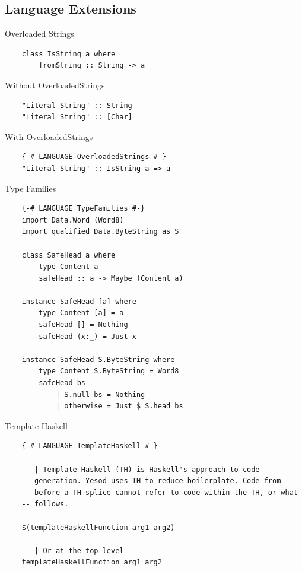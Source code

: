 \documentclass[pdf]{beamer}
\begin{document}
\subsection{Language Extensions}
\begin{frame}[fragile]{Overloaded Strings}
  \begin{verbatim}
    class IsString a where
        fromString :: String -> a
  \end{verbatim}
  \pause
  \vspace{1em}
  Without OverloadedStrings
  \begin{verbatim}
    "Literal String" :: String
    "Literal String" :: [Char]
  \end{verbatim}
  \pause
  \vspace{1em}
  With OverloadedStrings
  \begin{verbatim}
    {-# LANGUAGE OverloadedStrings #-}
    "Literal String" :: IsString a => a
  \end{verbatim}
\end{frame}

\begin{frame}[fragile]{Type Families}
  \begin{verbatim}
    {-# LANGUAGE TypeFamilies #-}
    import Data.Word (Word8)
    import qualified Data.ByteString as S
    
    class SafeHead a where
        type Content a
        safeHead :: a -> Maybe (Content a)
    
    instance SafeHead [a] where
        type Content [a] = a
        safeHead [] = Nothing
        safeHead (x:_) = Just x
    
    instance SafeHead S.ByteString where
        type Content S.ByteString = Word8
        safeHead bs
            | S.null bs = Nothing
            | otherwise = Just $ S.head bs
  \end{verbatim}
\end{frame}

\begin{frame}[fragile]{Template Haskell}
  \begin{verbatim}
    {-# LANGUAGE TemplateHaskell #-}
    
    -- | Template Haskell (TH) is Haskell's approach to code
    -- generation. Yesod uses TH to reduce boilerplate. Code from
    -- before a TH splice cannot refer to code within the TH, or what
    -- follows.

    $(templateHaskellFunction arg1 arg2)

    -- | Or at the top level
    templateHaskellFunction arg1 arg2
  \end{verbatim}
\end{frame}
\end{document}
